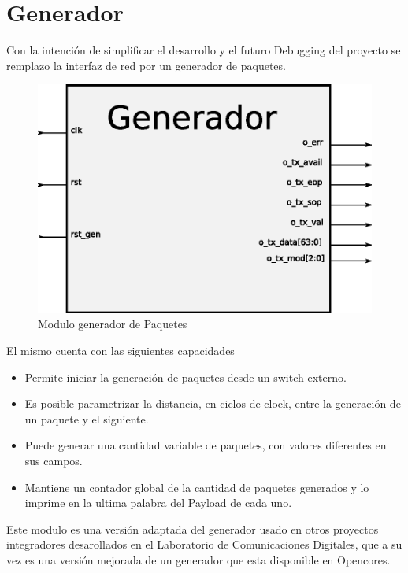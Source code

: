 \section{Generador}

Con la intención de simplificar el desarrollo y el futuro Debugging del proyecto se remplazo la interfaz de red por un generador de paquetes.

\begin{figure}[H]
  \centering
	\includegraphics[scale=0.60]{3-arquitectura/graf/bloqgenerador.eps}
  \caption{Modulo generador de Paquetes}
  \label{fig:gen}
\end{figure}


El mismo cuenta con las siguientes capacidades

\begin{itemize}
	\item Permite iniciar la generación de paquetes desde un switch externo.
	\item Es posible parametrizar la distancia, en ciclos de clock, entre la generación de un paquete y el siguiente.
	\item Puede generar una cantidad variable de paquetes, con valores diferentes en sus campos.
	\item Mantiene un contador global de la cantidad de paquetes generados y lo imprime en la ultima palabra del Payload de cada uno.
\end{itemize}

Este modulo es una versión adaptada del generador usado en otros proyectos integradores desarollados en el Laboratorio de Comunicaciones Digitales, que a su vez es una versión mejorada de un generador que esta disponible en Opencores.

